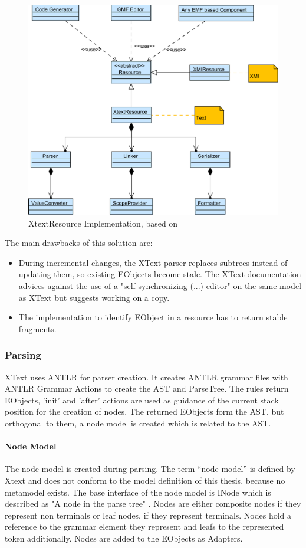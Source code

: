 \begin{figure}
\centering
\includegraphics[scale=0.75]{gfx/ex/Xtext} 
\caption{XtextResource Implementation, based on \cite{XTextMan}}
\label{XtextArch}
\end{figure}
The main drawbacks of this solution are:
\begin{itemize}
	\item During incremental changes, the XText parser replaces subtrees instead of updating them, so existing EObjects become stale. The XText documentation advices against the use of a "self-synchronizing (...) editor" on the same model as XText but suggests working on a copy.
	\item The implementation to identify EObject in a resource has to return stable fragments.
\end{itemize}

\subsubsection{Parsing}
XText uses ANTLR \cite{ANTLR} for parser creation. It creates ANTLR grammar files with ANTLR Grammar Actions to create the AST and ParseTree. The rules return EObjects, 'init' and 'after' actions are used as guidance of the current stack position for the creation of nodes. The returned EObjects form the AST, but orthogonal to them, a node model is created which is related to the AST. 

\paragraph{Node Model}
The node model is created during parsing. The term ``node model'' is defined by Xtext and does not conform to the model definition of this thesis, because no metamodel exists. The base interface of the node model is INode which  is described as "A node in the parse tree" \cite{XTextAPI}. Nodes are either composite nodes if they represent non terminals or leaf nodes, if they represent terminals. Nodes hold a reference to the grammar element they represent and leafs to the represented token additionally. Nodes are added to the EObjects as Adapters.

